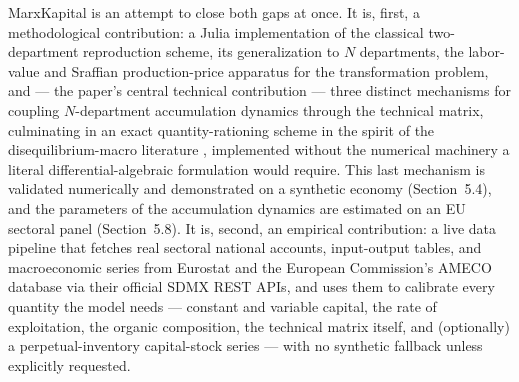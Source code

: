 \documentclass[11pt]{article}
\begin{document}
MarxKapital is an attempt to close both gaps at once. It is, first, a
methodological contribution: a Julia implementation of the classical
two-department reproduction scheme, its generalization to $N$ departments,
the labor-value and Sraffian production-price apparatus for the
transformation problem, and --- the paper's central technical
contribution --- three distinct mechanisms for coupling $N$-department
accumulation dynamics through the technical matrix, culminating in an
exact quantity-rationing scheme in the spirit of the disequilibrium-macro
literature \citep{barro1971general,benassy1975neokeynesian}, implemented
without the numerical machinery a literal differential-algebraic
formulation would require. This last mechanism is validated
numerically and demonstrated on a synthetic economy (Section~5.4), and
the parameters of the accumulation dynamics are estimated on an EU
sectoral panel (Section~5.8). It is, second, an empirical contribution: a
live data pipeline that fetches real sectoral national accounts,
input-output tables, and macroeconomic series from Eurostat and the
European Commission's AMECO database via their official SDMX REST APIs,
and uses them to calibrate every quantity the model needs --- constant
and variable capital, the rate of exploitation, the organic composition,
the technical matrix itself, and (optionally) a perpetual-inventory
capital-stock series --- with no synthetic fallback unless explicitly
requested.
\end{document}
